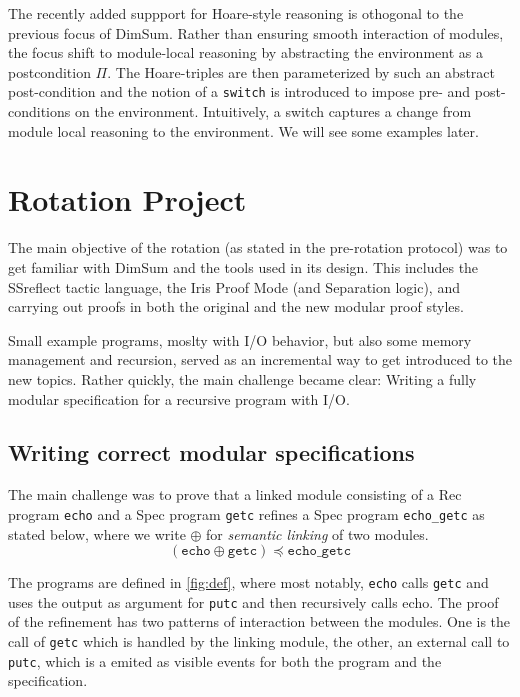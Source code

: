 \documentclass[runningheads, orivec]{llncs}
\begin{document}
The recently added suppport for Hoare-style reasoning is othogonal to the previous focus of DimSum. Rather than ensuring smooth interaction of modules, the focus shift to module-local reasoning by abstracting the environment as a postcondition $\Pi$. The Hoare-triples are then parameterized by such an abstract post-condition and the notion of a \texttt{switch} is introduced to impose pre- and post-conditions on the environment. Intuitively, a switch captures a change from module local reasoning to the environment. We will see some examples later.

\section{Rotation Project}\label{sec:proj}

The main objective of the rotation (as stated in the pre-rotation protocol) was to get familiar with DimSum and the tools used in its design. This includes the SSreflect tactic language, the Iris Proof Mode\cite{iris} (and Separation logic), and carrying out proofs in both the original and the new modular proof styles.

Small example programs, moslty with I/O behavior, but also some memory management and recursion, served as an incremental way to get introduced to the new topics. Rather quickly, the main challenge became clear: Writing a fully modular specification for a recursive program with I/O.

\subsection{Writing correct modular specifications}

The main challenge was to prove that a linked module consisting of a Rec program \texttt{echo} and a Spec program \texttt{getc} refines a Spec program \texttt{echo\_getc} as stated below, where we write $\oplus$ for \emph{semantic linking} of two modules.
\[(\texttt{echo} \oplus \texttt{getc}) \preceq \texttt{echo\_getc}\]

The programs are defined in \cref{fig:def}, where most notably, \texttt{echo} calls \texttt{getc} and uses the output as argument for \texttt{putc} and then recursively calls echo. The proof of the refinement has two patterns of interaction between the modules. One is the call of \texttt{getc} which is handled by the linking module, the other, an external call to \texttt{putc}, which is a emited as visible events for both the program and the specification.
\end{document}
